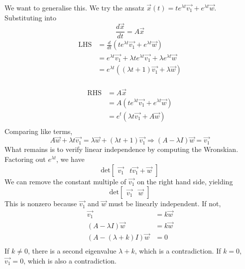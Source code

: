 \documentclass[12pt]{article}
\begin{document}
We want to generalise this. We try the ansatz $\vec{x}(t) = te^{\lambda t}\vec{v_1} + e^{\lambda t}\vec{w}$. Substituting into
$$\frac{d\vec{x}}{dt} = A\vec{x}$$
\begin{align*}
	\text{LHS} &= \frac{d}{dt} \left(te^{\lambda t}\vec{v_1} + e^{\lambda t}\vec{w}\right) \\
		   &= e^{\lambda t}\vec{v_1} + \lambda te^{\lambda t}\vec{v_1} + \lambda e^{\lambda t}\vec{w} \\
		   &= e^{\lambda t} \left((\lambda t + 1) \vec{v_1} + \lambda\vec{w}\right) \\
\end{align*}

\begin{align*}
	\text{RHS} &= A\vec{x} \\
		   &= A\left(te^{\lambda t}\vec{v_1} + e^{\lambda t}\vec{w}\right) \\
		   &= e^t\left(\lambda t\vec{v_1} + A\vec{w}\right) \\
\end{align*}
Comparing like terms,
$$A\vec{w} + \lambda t \vec{v_1} = \lambda \vec{w} + (\lambda t + 1) \vec{v_1} \Rightarrow (A-\lambda I)\vec{w} = \vec{v_1}$$
What remains is to verify linear independence by computing the Wronskian. Factoring out $e^{\lambda t}$, we have
$$\text{det} \begin{bmatrix} \vec{v_1} & t\vec{v_1}+\vec{w} \end{bmatrix}$$
We can remove the constant multiple of $\vec{v_1}$ on the right hand side, yielding
$$\text{det} \begin{bmatrix} \vec{v_1} & \vec{w}\end{bmatrix}$$
This is nonzero because $\vec{v_1}$ and $\vec{w}$ must be linearly independent. If not,
\begin{align*}
	\vec{v_1} &= k\vec{w} \\
	(A-\lambda I) \vec{w} &= k\vec{w} \\
	(A - (\lambda + k)I) \vec{w} &= 0 \\
\end{align*}
If $k\neq0$, there is a second eigenvalue $\lambda + k$, which is a contradiction. If $k=0$, $\vec{v_1}=0$, which is also a contradiction.
\end{document}

